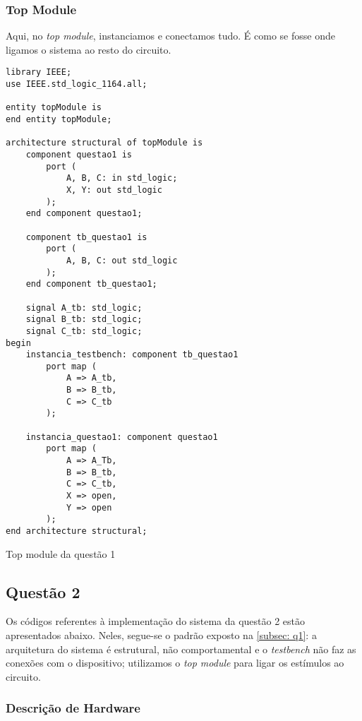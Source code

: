 \documentclass[a4paper,12pt]{article}
\newenvironment{code}{\captionsetup{type=listing}}{}
\begin{document}
\subsubsection{Top Module}
 Aqui, no \textit{top module}, instanciamos e conectamos tudo. É como se fosse onde ligamos o sistema ao resto do circuito.

\begin{code}
    \begin{verbatim}
library IEEE;
use IEEE.std_logic_1164.all;

entity topModule is
end entity topModule;

architecture structural of topModule is
    component questao1 is
        port (
            A, B, C: in std_logic;
            X, Y: out std_logic
        );
    end component questao1;

    component tb_questao1 is
        port (
            A, B, C: out std_logic
        );
    end component tb_questao1;

    signal A_tb: std_logic;
    signal B_tb: std_logic;
    signal C_tb: std_logic;
begin
    instancia_testbench: component tb_questao1
        port map (
            A => A_tb,
            B => B_tb,
            C => C_tb
        );

    instancia_questao1: component questao1
        port map (
            A => A_Tb,
            B => B_tb,
            C => C_tb,
            X => open,
            Y => open
        );
end architecture structural;
    \end{verbatim}
    \caption{Top module da questão 1}
\end{code}

\subsection{Questão 2}
Os códigos referentes à implementação do sistema da questão 2 estão apresentados abaixo. Neles, segue-se o padrão exposto na \autoref{subsec: q1}: a arquitetura do sistema é estrutural, não comportamental e o \textit{testbench} não faz as conexões com o dispositivo; utilizamos o \textit{top module} para ligar os estímulos ao circuito.

\subsubsection{Descrição de Hardware}
\end{document}
